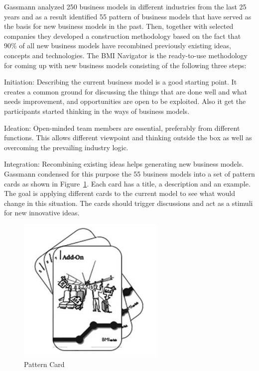 		Gassmann analyzed 250 business models in different industries from the last 25 years and as a result identified 55 pattern of business models that have served as the basis for new business models in the past. Then, together with selected companies they developed a construction methodology based on the fact that 90\% of all new business models have recombined previously existing ideas, concepts and  technologies. The BMI Navigator is the ready-to-use methodology for coming up with new business models consisting of the following three steps:
					
		Initiation: Describing the current business model is a good starting point. It creates a common ground for discussing the things that are done well and what needs improvement, and opportunities are open to be exploited. Also it get the participants started thinking in the ways of business models.

		Ideation: Open-minded team members are essential, preferably from different functions. This allows different viewpoint and thinking outside the box as well as overcoming the prevailing industry logic.
		
		Integration: Recombining existing ideas helps generating new business models. Gassmann condensed for this purpose the 55 business models into a set of pattern cards as shown in Figure~\ref{fig:pattern_card}. Each card has a title, a description and an example. The goal is applying different cards to the current model to see what would change in this situation. The cards should trigger discussions and act as a stimuli for new innovative ideas.

		\begin{figure}[ht]
			    \begin{center}
			    \includegraphics[scale=0.6]{Talk11/Figure2.png}
			    \end{center}
			    \caption{Pattern Card}
			    \label{fig:pattern_card}
			\end{figure}

